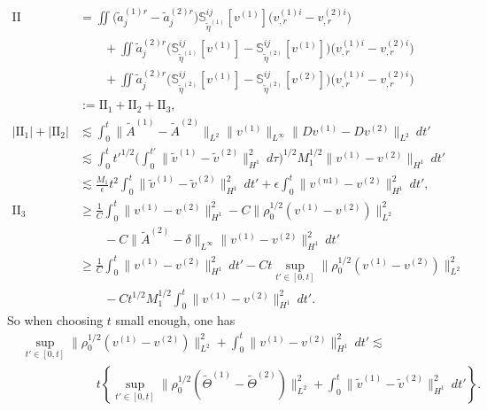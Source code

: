 \documentclass[12pt,a4paper]{amsart}
\numberwithin{equation}{section}
\theoremstyle{plain}
\theoremstyle{definition}
\begin{document}
\begin{align*}
\mathrm{II}&=\iint \Big( \widetilde{a}^{(1)r}_j-\widetilde{a}^{(2)r}_j\Big)\mathbb{S}^{ij}_{\widetilde{\eta}^{(1)}}[v^{(1)}]\Big(v^{(1)i}_{,r}-v^{(2)i}_{,r}\Big) \\
 &\qquad+\iint \widetilde{a}^{(2)r}_j\Big(\mathbb{S}^{ij}_{\widetilde{\eta}^{(1)}}[v^{(1)}]-\mathbb{S}^{ij}_{\widetilde{\eta}^{(2)}}[v^{(1)}]\Big)\Big(v^{(1)i}_{,r}-v^{(2)i}_{,r}\Big) \\
 &\qquad+\iint \widetilde{a}^{(2)r}_j\Big(\mathbb{S}^{ij}_{\widetilde{\eta}^{(2)}}[v^{(1)}]-\mathbb{S}^{ij}_{\widetilde{\eta}^{(2)}}[v^{(2)}]\Big)\Big(v^{(1)i}_{,r}-v^{(2)i}_{,r}\Big)\\
 &:=\mathrm{II}_1+\mathrm{II}_2+\mathrm{II}_3,\\
|\mathrm{II}_1|+|\mathrm{II}_2|&\lesssim \int_{0}^{t} \|\widetilde{A}^{(1)}-\widetilde{A}^{(2)}\|_{L^2}\|v^{(1)}\|_{L^{\infty}}\|Dv^{(1)}-Dv^{(2)}\|_{L^{2}} \ dt'\\
 &\lesssim \int_{0}^{t} t'^{1/2} \Big(\int_{0}^{t'} \|\widetilde{v}^{(1)}-\widetilde{v}^{(2)}\|_{H^1}^2\ d\tau \Big)^{1/2} M_1^{1/2}\|v^{(1)}-v^{(2)}\|_{H^1} \ dt'\\
 &\lesssim \frac{M_1}{\epsilon}t^2 \int_{0}^{t} \|\widetilde{v}^{(1)}-\widetilde{v}^{(2)}\|_{H^1}^2 \ dt' +\epsilon\int_{0}^{t} \|v^{(n1)}-v^{(2)}\|_{H^1}^2 \ dt',\\
\mathrm{II}_3&\geq \frac{1}{C}\int_{0}^{t} \|v^{(1)}-v^{(2)}\|_{H^1}^2-C\|\rho_{0}^{1/2}(v^{(1)}-v^{(2)})\|_{L^{2}}^2\\
 &\qquad-C\|\widetilde{A}^{(2)}-\delta\|_{L^{\infty}}\|v^{(1)}-v^{(2)}\|_{H^1}^2 \ dt' \\
 &\geq \frac{1}{C}\int_{0}^{t} \|v^{(1)}-v^{(2)}\|_{H^1}^2\ dt'-Ct\sup\limits_{t'\in[0,t]}\|\rho_{0}^{1/2}(v^{(1)}-v^{(2)})\|_{L^{2}}^2\\
 &\qquad-C t^{1/2}M_1^{1/2}\int_{0}^{t}\|v^{(1)}-v^{(2)}\|_{H^1}^2 \ dt'.
\end{align*}
So when choosing $t$ small enough, one has
\begin{equation}\label{contraction1}
\begin{aligned}
&\sup\limits_{t'\in[0,t]}\|\rho_{0}^{1/2}(v^{(1)}-v^{(2)})\|_{L^{2}}^2+\int_{0}^{t} \|v^{(1)}-v^{(2)}\|_{H^1}^2\ dt'\lesssim\\
&\qquad\qquad\qquad t\left\{\sup\limits_{t'\in[0,t]}\|\rho_{0}^{1/2}(\widetilde{\Theta}^{(1)}-\widetilde{\Theta}^{(2)})\|_{L^{2}}^2+\int_{0}^{t} \|\widetilde{v}^{(1)}-\widetilde{v}^{(2)}\|_{H^1}^2\ dt'\right\}.
\end{aligned}
\end{equation}
\end{document}
